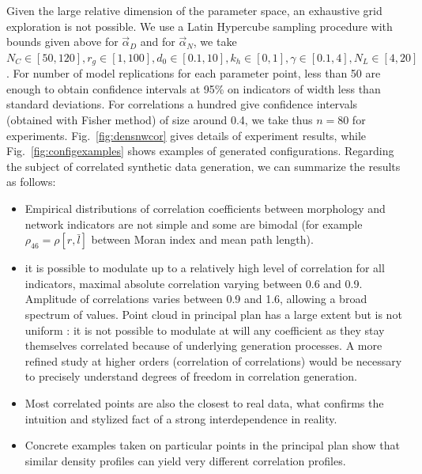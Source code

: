 \documentclass{bmcart}
\begin{document}
Given the large relative dimension of the parameter space, an exhaustive grid exploration is not possible. We use a Latin Hypercube sampling procedure with bounds given above for $\vec{\alpha}_D$ and for $\vec{\alpha}_N$, we take $N_C \in [50,120], r_g \in [1,100] , d_0 \in [0.1,10] , k_h \in [0,1] , \gamma \in [0.1,4],N_L\in [4,20]$. For number of model replications for each parameter point, less than 50 are enough to obtain confidence intervals at 95\% on indicators of width less than standard deviations. For correlations a hundred give confidence intervals (obtained with Fisher method) of size around 0.4, we take thus $n=80$ for experiments. Fig.~\ref{fig:densnwcor} gives details of experiment results, while Fig.~\ref{fig:configexamples} shows examples of generated configurations. Regarding the subject of correlated synthetic data generation, we can summarize the results as follows:
\begin{itemize}
\item Empirical distributions of correlation coefficients between morphology and network indicators are not simple and some are bimodal (for example $\rho_{46}=\rho[r,\bar{l}]$  between Moran index and mean path length).
\item it is possible to modulate up to a relatively high level of correlation for all indicators, maximal absolute correlation varying between 0.6 and 0.9. Amplitude of correlations varies between 0.9 and 1.6, allowing a broad spectrum of values. Point cloud in principal plan has a large extent but is not uniform : it is not possible to modulate at will any coefficient as they stay themselves correlated because of underlying generation processes. A more refined study at higher orders (correlation of correlations) would be necessary to precisely understand degrees of freedom in correlation generation.
\item Most correlated points are also the closest to real data, what confirms the intuition and stylized fact of a strong interdependence in reality.
\item Concrete examples taken on particular points in the principal plan show that similar density profiles can yield very different correlation profiles.
\end{itemize}



\end{document}
